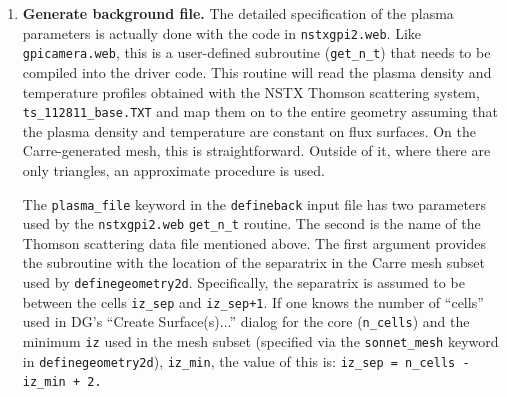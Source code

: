 \documentclass[12pt]{report}
\begin{document}
\begin{enumerate}
There are two {\tt definegeometry2d} input 
files here, one for the 2-D (axisymmetric: 
\verb+nstx_25_dg2d.in+) case and one for 3-D (\verb+nstx_25_dg3d.in+).  
The results
contained in the \verb+examples/He_GPI+ directory 
are for the much quicker running 2-D
case.  Note that 
many of the 3-D lines appear in the 2-D file, but are commented
out.  Both runs utilize just the portion of the Carre mesh directly
in front of the gas manifold (``puffer'' in the {\tt definegeometry2d}
input file); this is done using the additional arguments
to the \verb+sonnet_mesh+ keyword.  One would establish the values of these
indices during the creation of the DG polygons.  The 3-D run then only 
simulates a portion of the torus (arguments to the \verb+bounds+ and 
\verb+y_values+
keywords).  These steps keep the problem size and run time down.

The emulation of the GPI camera view is done with the code in 
\verb+gpicamera.web+.
Prior to compiling {\tt definegeometry2d}, the user should copy this file
to \verb+usr2ddetector.web+ (see the brief explanation at the top of the
default version of the file \verb+def2ddetector.web+).  This is actually
just a placeholder $5 \times 5$ 
pixel version of the camera.  The full resolution
image is created during post-processing with the {\tt postdetector} routine.
\begin{verbatim}
cd ../src
cp gpicamera.web usr2ddetector.web
cd ../LINUX64
gmake definegeometry2d 
./definegeometry2d ../examples/He_GPI/nstx_25_dg2d.in
\end{verbatim}
  \item {\bf Generate background file.} The detailed
specification of the plasma parameters is actually done with
the code in \verb+nstxgpi2.web+.  Like \verb+gpicamera.web+, 
this is a user-defined
subroutine (\verb+get_n_t+) that needs to be compiled into the driver code.
This routine will read the plasma density and temperature profiles 
obtained with the NSTX 
Thomson scattering system, \verb+ts_112811_base.TXT+ and map them on to 
the entire geometry assuming that the plasma density
and temperature are constant on flux surfaces.  On the Carre-generated
mesh, this is straightforward.  Outside of it, where there are only
triangles, an approximate procedure is used.

The \verb+plasma_file+ keyword in the {\tt defineback} input file has two
parameters used by the {\tt nstxgpi2.web} \verb+get_n_t+ routine.
The second is the name of the Thomson scattering data file mentioned above.
The first argument
provides the subroutine with the location 
of the separatrix in the Carre mesh
subset used by {\tt definegeometry2d}.
Specifically, the separatrix is assumed to be between the cells \verb+iz_sep+
and \verb!iz_sep+1!.
If one knows the number of ``cells'' used in DG's
``Create Surface(s)...'' dialog for the core (\verb+n_cells+) 
and the minimum \verb+iz+
used in the mesh subset (specified via the \verb+sonnet_mesh+ keyword in 
{\tt definegeometry2d}), \verb+iz_min+, 
the value of this is: \verb!iz_sep = n_cells - iz_min + 2.!


\end{enumerate}
\end{document}
